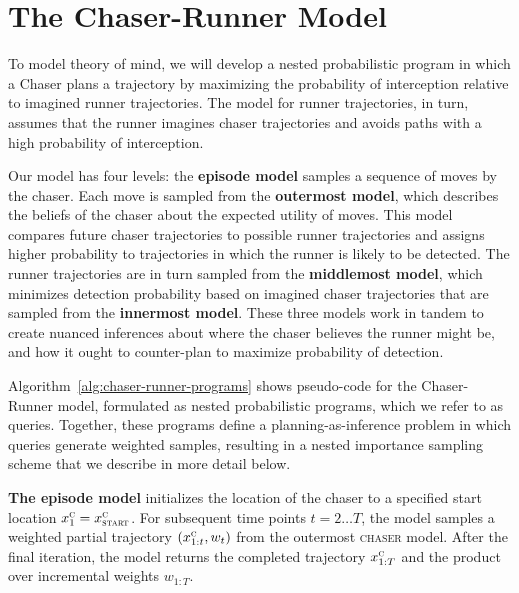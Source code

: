 \documentclass[twoside]{article}
\begin{document}

\section{The Chaser-Runner Model}
\label{sec:tcrm}

To model theory of mind, we will develop a nested probabilistic program in which a Chaser plans a trajectory by maximizing the probability of interception relative to imagined runner trajectories. The model for runner trajectories, in turn, assumes that the runner imagines chaser trajectories and avoids paths with a high probability of interception. 

Our model has four levels: the \textbf{episode model} samples a sequence of moves by the chaser. Each move is sampled from the \textbf{outermost model}, which describes the
beliefs of the chaser about the expected utility of moves. This model compares future chaser trajectories to possible runner trajectories and assigns higher probability to trajectories in which the runner is likely to be detected. The runner trajectories are in turn sampled from the  \textbf{middlemost model}, which minimizes detection probability based on imagined chaser trajectories that are sampled from the \textbf{innermost model}.
%
These three models work in tandem to create nuanced inferences about
where the chaser believes the runner might be, and how it ought to 
counter-plan to maximize probability of detection.

Algorithm~\ref{alg:chaser-runner-programs} shows pseudo-code for the Chaser-Runner model, formulated as nested probabilistic programs, which we refer to as queries. Together, these programs define a planning-as-inference problem \cite{toussaint06} in which queries generate weighted samples, resulting in a nested importance sampling  \cite{naesseth2015nested} scheme that we describe in more detail below.

\textbf{The episode model} initializes the location of the chaser to a specified start location $x^\textsc{c}_1 = x^\textsc{c}_\textsc{start}$. For subsequent time points $t=2 \ldots T$, the model samples a weighted partial trajectory $(x^\textsc{c}_{1:t}, w_t)$ from the outermost \textsc{chaser} model. After the final iteration, the model returns the completed trajectory $x^\textsc{c}_{1:T}$ and the product over incremental weights $w_{1:T}$.
\end{document}
